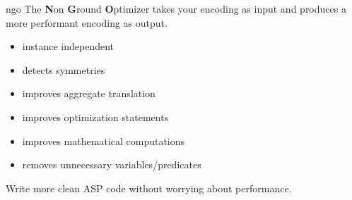 \begin{frame}{ngo}
The \textbf{N}on \textbf{G}round \textbf{O}ptimizer takes your encoding as input
and produces a more performant encoding as output.

  \begin{itemize}
  \item instance independent
  \item detects symmetries
  \item improves aggregate translation
  \item improves optimization statements
  \item improves mathematical computations
  \item removes unnecessary variables/predicates
  \end{itemize}
Write more clean ASP code without worrying about performance.
\end{frame}
%
